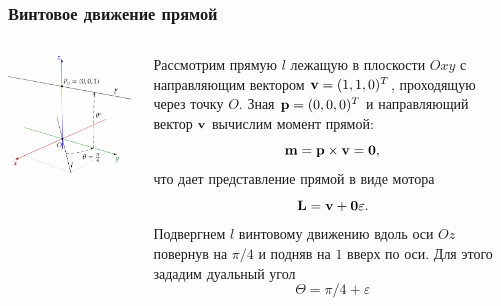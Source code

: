 \begin{frame}
  \frametitle{Винтовое движение прямой}
  \begin{columns}
    \begin{column}{0.4\textwidth}
      \begin{center}
        \includegraphics[width=\textwidth]{img/screws/moment07}
      \end{center}
    \end{column}
    \begin{column}{0.6\textwidth}
      Рассмотрим прямую $l$ лежащую в плоскости $Oxy$ с направляющим вектором $\vb{v} = (1, 1, 0)^T$, проходящую через точку $O$. Зная $\vb{p} = (0, 0, 0)^T$ и направляющий вектор $\vb{v}$ вычислим момент прямой:
      \begin{equation*}
        \vb{m} = \vb{p} \times \vb{v} = \vb{0},
      \end{equation*}
      что дает представление прямой в виде мотора
      \begin{equation*}
        \vb{L} = \vb{v} + \vb{0}\varepsilon.
      \end{equation*}
      Подвергнем $l$ винтовому движению вдоль оси $Oz$ повернув на $\pi/4$ и подняв на $1$ вверх по оси. Для этого зададим дуальный угол
      \begin{equation*}
        \Theta = \pi/4 + \varepsilon

\end{equation*}
\end{column}
\end{columns}
\end{frame}
